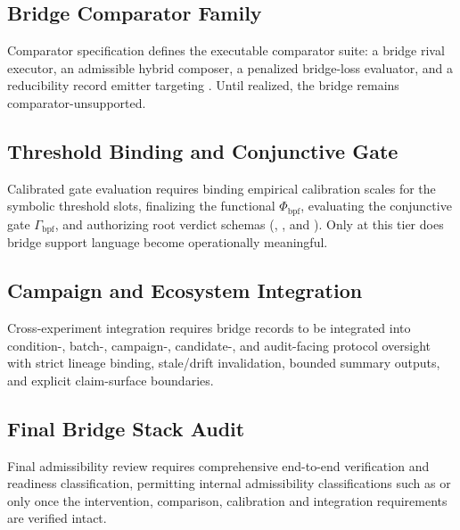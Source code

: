\documentclass[11pt,a4paper]{article}
\theoremstyle{definition}
\newcommand{\PhiBridge}{\Phi_{\mathrm{bpf}}}
\newcommand{\GateBridge}{\Gamma_{\mathrm{bpf}}}
\begin{document}
\subsection{Bridge Comparator Family}
Comparator specification defines the executable comparator suite: a bridge rival executor, an admissible hybrid composer, a penalized bridge-loss evaluator, and a reducibility record emitter targeting \texttt{\allowbreak{}\allowbreak{}\allowbreak{}}. Until realized, the bridge remains comparator-unsupported.

\subsection{Threshold Binding and Conjunctive Gate}
Calibrated gate evaluation requires binding empirical calibration scales for the symbolic threshold slots, finalizing the functional $\PhiBridge$, evaluating the conjunctive gate $\GateBridge$, and authorizing root verdict schemas (\texttt{\allowbreak{}\allowbreak{}\allowbreak{}\allowbreak{}}, \texttt{\allowbreak{}\allowbreak{}\allowbreak{}\allowbreak{}}, and \texttt{\allowbreak{}\allowbreak{}\allowbreak{}}). Only at this tier does bridge support language become operationally meaningful.

\subsection{Campaign and Ecosystem Integration}
Cross-experiment integration requires bridge records to be integrated into condition-, batch-, campaign-, candidate-, and audit-facing protocol oversight with strict lineage binding, stale/drift invalidation, bounded summary outputs, and explicit claim-surface boundaries.

\subsection{Final Bridge Stack Audit}
Final admissibility review requires comprehensive end-to-end verification and readiness classification, permitting internal admissibility classifications such as \texttt{\allowbreak{}\allowbreak{}\allowbreak{}} or \texttt{\allowbreak{}\allowbreak{}} only once the intervention, comparison, calibration and integration requirements are verified intact.
\end{document}

